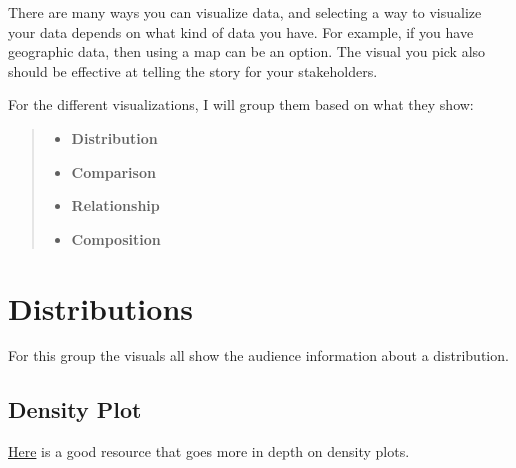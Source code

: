 \documentclass[
  letterpaper,
  DIV=11,
  numbers=noendperiod]{scrreprt}
\begin{document}
There are many ways you can visualize data, and selecting a way to
visualize your data depends on what kind of data you have. For example,
if you have geographic data, then using a map can be an option. The
visual you pick also should be effective at telling the story for your
stakeholders.

For the different visualizations, I will group them based on what they
show:

\begin{quote}
\begin{itemize}
\item
  \textbf{Distribution}
\item
  \textbf{Comparison}
\item
  \textbf{Relationship}
\item
  \textbf{Composition}
\end{itemize}
\end{quote}

\hypertarget{distributions}{%
\section{Distributions}\label{distributions}}

For this group the visuals all show the audience information about a
distribution.

\hypertarget{density-plot}{%
\subsection{Density Plot}\label{density-plot}}

\href{https://www.data-to-viz.com/graph/density.html}{Here} is a good
resource that goes more in depth on density plots.
\end{document}
